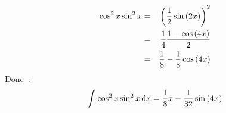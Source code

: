 \documentclass{magnolia}
\begin{document}
\begin{itemize}
\begin{exoUnique}
\begin{sol}
\begin{eqnarray*}
    \cos^2 x\sin^2 x&=&\left(\frac{1}{2}\sin\left(2x\right)\right)^2\\
     &=&\frac{1}{4}\frac{1-\cos\left(4x\right)}{2}\\
     &=&\frac{1}{8}-\frac{1}{8}\cos\left(4x\right)
    \end{eqnarray*}
    Donc~:
    $$\int_{}^{} \cos^2 x\sin^2 x\,\text{d}x=\frac{1}{8}x-\frac{1}{32}\sin\left(4x\right)$$
    \end{sol}
\end{exoUnique}

\end{itemize}
\end{document}
